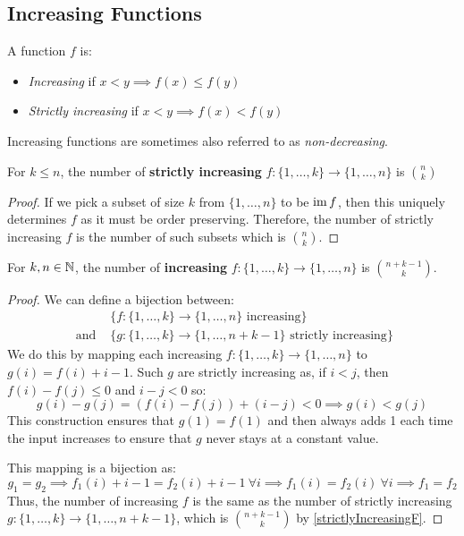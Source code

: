 \documentclass[../main.tex]{subfiles}
\begin{document}
\subsection{Increasing Functions}
\begin{definition}
  A function $f$ is:
  \begin{itemize}
    \item \textit{Increasing} if $x < y \implies f(x) \leq f(y)$
    \item \textit{Strictly increasing} if $x < y \implies f(x) < f(y)$
  \end{itemize}
\end{definition}
\begin{remark}[Nomenclature]
  Increasing functions are sometimes also referred to as \textit{non-decreasing}.
\end{remark}
\begin{proposition}
  For $k \leq n$, the number of \textbf{strictly increasing} $f: \{1, \ldots, k\} \to \{1, \ldots, n\}$ is $\binom{n}{k}$
  \label{strictlyIncreasingF}
\end{proposition}
\begin{proof}
  If we pick a subset of size $k$ from $\{1, \ldots, n\}$ to be $\operatorname{im} f$, then this uniquely determines $f$ as it must be order preserving.
  Therefore, the number of strictly increasing $f$ is the number of such subsets which is $\binom{n}{k}$.
\end{proof}
\begin{proposition}
  For $k, n \in \mathbb{N}$, the number of \textbf{increasing} $f: \{1, \ldots, k\} \to \{1, \ldots, n\}$ is $\binom{n + k - 1}{k}$.
\end{proposition}
\begin{proof}
  We can define a bijection between:
  \begin{align*}
    &\{f: \{1, \ldots, k\} \to \{1, \ldots, n\} \text{ increasing}\} \\
    \text{ and }&\{g: \{1, \ldots, k\} \to \{1, \ldots, n + k - 1\} \text{ strictly increasing}\}
  \end{align*}
  We do this by mapping each increasing $f: \{1, \ldots, k\} \to \{1, \ldots, n\}$ to $g(i) = f(i) + i - 1$.
  Such $g$ are strictly increasing as, if $i < j$, then $f(i) - f(j) \leq 0$ and $i - j < 0$ so:
  \[
    g(i) - g(j) = (f(i) - f(j)) + (i - j) < 0 \implies g(i) < g(j)
  \]
  This construction ensures that $g(1) = f(1)$ and then always adds 1 each time the input increases to ensure that $g$ never stays at a constant value.

  This mapping is a bijection as:
  \[
    g_1 = g_2 \implies f_1(i) + i - 1 = f_2(i) + i - 1\ \forall i \implies f_1(i) = f_2(i)\ \forall i \implies f_1 = f_2
  \]
  Thus, the number of increasing $f$ is the same as the number of strictly increasing $g: \{1, \ldots, k\} \to \{1, \ldots, n + k - 1\}$, which is $\binom{n + k - 1}{k}$ by \cref{strictlyIncreasingF}.
\end{proof}
\end{document}

